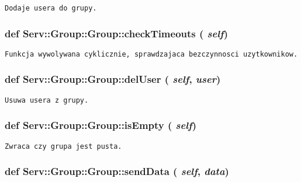 \footnotesize\begin{verbatim}Dodaje usera do grupy.\end{verbatim}
\normalsize
 \hypertarget{class_serv_1_1_group_1_1_group_ff52dadf0f67e54340f9602cc3a6fbba}{
\subsubsection[{checkTimeouts}]{\setlength{\rightskip}{0pt plus 5cm}def Serv::Group::Group::checkTimeouts ( {\em self})}}
\label{class_serv_1_1_group_1_1_group_ff52dadf0f67e54340f9602cc3a6fbba}




\footnotesize\begin{verbatim}Funkcja wywolywana cyklicznie, sprawdzajaca bezczynnosci uzytkownikow.\end{verbatim}
\normalsize
 \hypertarget{class_serv_1_1_group_1_1_group_48768b6b5440e56d42d632085b2a8aef}{
\subsubsection[{delUser}]{\setlength{\rightskip}{0pt plus 5cm}def Serv::Group::Group::delUser ( {\em self}, \/   {\em user})}}
\label{class_serv_1_1_group_1_1_group_48768b6b5440e56d42d632085b2a8aef}




\footnotesize\begin{verbatim}Usuwa usera z grupy.\end{verbatim}
\normalsize
 \hypertarget{class_serv_1_1_group_1_1_group_51e7ce8393ee398260d4e12e904da5ab}{
\subsubsection[{isEmpty}]{\setlength{\rightskip}{0pt plus 5cm}def Serv::Group::Group::isEmpty ( {\em self})}}
\label{class_serv_1_1_group_1_1_group_51e7ce8393ee398260d4e12e904da5ab}




\footnotesize\begin{verbatim}Zwraca czy grupa jest pusta.\end{verbatim}
\normalsize
 \hypertarget{class_serv_1_1_group_1_1_group_cbb0137781676208d4de16b90d8d9cc0}{
\subsubsection[{sendData}]{\setlength{\rightskip}{0pt plus 5cm}def Serv::Group::Group::sendData ( {\em self}, \/   {\em data})}}
\label{class_serv_1_1_group_1_1_group_cbb0137781676208d4de16b90d8d9cc0}




